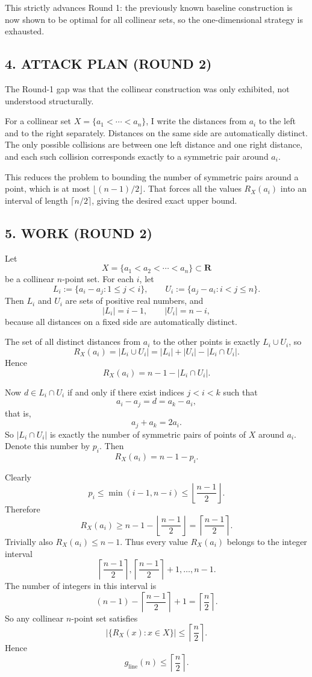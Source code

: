 This strictly advances Round 1: the previously known baseline construction is now shown to be optimal for all collinear sets, so the one-dimensional strategy is exhausted.

\subsection*{4. ATTACK PLAN (ROUND 2)}

The Round-1 gap was that the collinear construction was only exhibited, not understood structurally.

For a collinear set $X=\{a_1<\cdots<a_n\}$, I write the distances from $a_i$ to the left and to the right separately.  Distances on the same side are automatically distinct.  The only possible collisions are between one left distance and one right distance, and each such collision corresponds exactly to a symmetric pair around $a_i$.

This reduces the problem to bounding the number of symmetric pairs around a point, which is at most $\lfloor (n-1)/2\rfloor$.  That forces all the values $R_X(a_i)$ into an interval of length $\lceil n/2\rceil$, giving the desired exact upper bound.

\subsection*{5. WORK (ROUND 2)}

Let
\[
X=\{a_1<a_2<\cdots<a_n\}\subset \mathbf{R}
\]
be a collinear $n$-point set.  For each $i$, let
\[
L_i:=\{a_i-a_j:1\le j<i\},\qquad U_i:=\{a_j-a_i:i<j\le n\}.
\]
Then $L_i$ and $U_i$ are sets of positive real numbers, and
\[
|L_i|=i-1,\qquad |U_i|=n-i,
\]
because all distances on a fixed side are automatically distinct.

The set of all distinct distances from $a_i$ to the other points is exactly $L_i\cup U_i$, so
\[
R_X(a_i)=|L_i\cup U_i|=|L_i|+|U_i|-|L_i\cap U_i|.
\]
Hence
\[
R_X(a_i)=n-1-|L_i\cap U_i|.
\]

Now $d\in L_i\cap U_i$ if and only if there exist indices $j<i<k$ such that
\[
a_i-a_j=d=a_k-a_i,
\]
that is,
\[
a_j+a_k=2a_i.
\]
So $|L_i\cap U_i|$ is exactly the number of symmetric pairs of points of $X$ around $a_i$.
Denote this number by $p_i$.  Then
\[
R_X(a_i)=n-1-p_i.
\]

Clearly
\[
p_i\le \min(i-1,n-i)\le \left\lfloor\frac{n-1}{2}\right\rfloor.
\]
Therefore
\[
R_X(a_i)\ge n-1-\left\lfloor\frac{n-1}{2}\right\rfloor
=\left\lceil\frac{n-1}{2}\right\rceil.
\]
Trivially also $R_X(a_i)\le n-1$.  Thus every value $R_X(a_i)$ belongs to the integer interval
\[
\left\lceil\frac{n-1}{2}\right\rceil,\left\lceil\frac{n-1}{2}\right\rceil+1,\dots,n-1.
\]
The number of integers in this interval is
\[
(n-1)-\left\lceil\frac{n-1}{2}\right\rceil+1=\left\lceil\frac{n}{2}\right\rceil.
\]
So any collinear $n$-point set satisfies
\[
\bigl|\{R_X(x):x\in X\}\bigr|\le \left\lceil\frac{n}{2}\right\rceil.
\]
Hence
\[
g_{\mathrm{line}}(n)\le \left\lceil\frac{n}{2}\right\rceil.
\]

